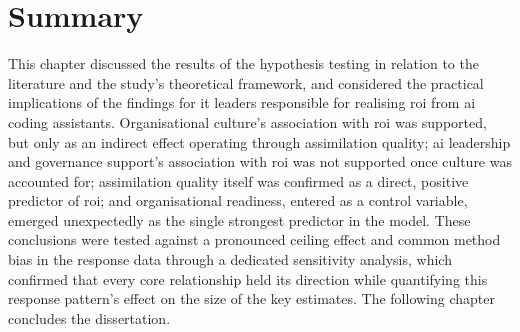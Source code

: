 \section{Summary}
\label{sec:Ch5 Summary}
This chapter discussed the results of the hypothesis testing in relation to the literature and the study's theoretical framework, and considered the practical implications of the findings for \gls{it} leaders responsible for realising \gls{roi} from \gls{ai} coding assistants. Organisational culture's association with \gls{roi} was supported, but only as an indirect effect operating through assimilation quality; \gls{ai} leadership and governance support's association with \gls{roi} was not supported once culture was accounted for; assimilation quality itself was confirmed as a direct, positive predictor of \gls{roi}; and organisational readiness, entered as a control variable, emerged unexpectedly as the single strongest predictor in the model. These conclusions were tested against a pronounced ceiling effect and common method bias in the response data through a dedicated sensitivity analysis, which confirmed that every core relationship held its direction while quantifying this response pattern's effect on the size of the key estimates. The following chapter concludes the dissertation.
